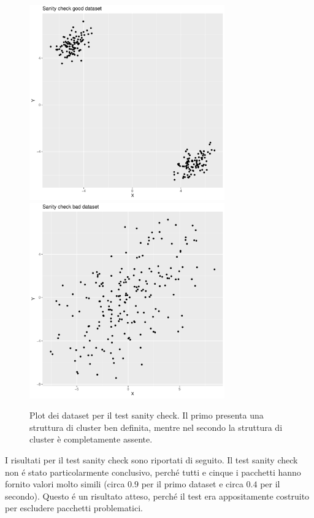 \documentclass[italian]{article}
\begin{document}
			\begin{figure}[h]
				\centering
				\includegraphics[width = 0.75\textwidth, height = 0.45\textheight]{doc/sc_dataset_good.pdf}
				\includegraphics[width = 0.75\textwidth, height = 0.45\textheight]{doc/sc_dataset_bad.pdf}
				\caption{Plot dei dataset per il test sanity check. Il primo
				presenta una struttura di cluster ben definita, mentre nel
				secondo la struttura di cluster è completamente assente.}
				\label{fig:sc}
			\end{figure}

			I risultati per il test sanity check sono riportati di seguito.
			Il test sanity check non é stato particolarmente conclusivo,
			perché tutti e cinque i pacchetti hanno fornito valori molto
			simili (circa $0.9$ per il primo dataset e circa $0.4$ per il
			secondo). Questo é un risultato atteso, perché il test era
			appositamente costruito per escludere pacchetti problematici.
\end{document}
